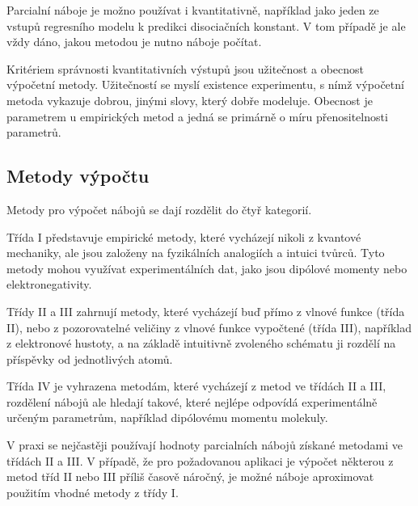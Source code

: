 \documentclass[10pt,draft,oneside]{fithesis2}
\newcommand\todo[1]{\textcolor{red}{[[#1]]}}
\renewcommand\todo[1]{}
\begin{document}
Parcialní náboje je možno používat i kvantitativně, například jako jeden ze vstupů regresního modelu k predikci disociačních konstant. V tom případě je ale vždy dáno, jakou metodou je nutno náboje počítat.




Kritériem správnosti kvantitativních výstupů jsou užitečnost a obecnost výpočetní metody. Užitečností se myslí existence experimentu, s nímž výpočetní metoda vykazuje dobrou, jinými slovy, který dobře modeluje. Obecnost je parametrem u empirických metod a jedná se primárně o míru přenositelnosti parametrů.

\subsection{Metody výpočtu}

Metody pro výpočet nábojů se dají rozdělit do čtyř kategorií. \citep[s.~50]{cramer2004essentials}

Třída I představuje empirické metody, které vycházejí nikoli z kvantové mechaniky, ale jsou založeny na fyzikálních analogiích a intuici tvůrců. Tyto metody mohou využívat experimentálních dat, jako jsou dipólové momenty nebo elektronegativity.

\todo{definice elektonové hustoty a vzorec}

Třídy II a III zahrnují metody, které vycházejí buď přímo z vlnové funkce (třída II), nebo z pozorovatelné veličiny z vlnové funkce vypočtené (třída III), například z elektronové hustoty, a na základě intuitivně zvoleného schématu ji rozdělí na příspěvky od jednotlivých atomů.

Třída IV je vyhrazena metodám, které vycházejí z metod ve třídách II a III, rozdělení nábojů ale hledají takové, které nejlépe odpovídá experimentálně určeným parametrům, například dipólovému momentu molekuly.

V praxi se nejčastěji používají hodnoty parcialních nábojů získané metodami ve třídách II a III. V případě, že pro požadovanou aplikaci je výpočet některou z metod tříd II nebo III příliš časově náročný, je možné náboje aproximovat použitím vhodné metody z třídy I.
\end{document}
